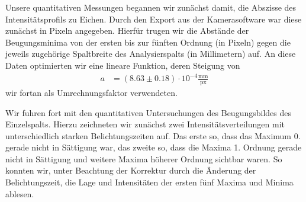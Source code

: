 Unsere quantitativen Messungen begannen wir zunächst damit, die Abszisse des Intensitätsprofils zu Eichen. Durch den Export aus der Kamerasoftware war diese zunächst in Pixeln angegeben. Hierfür trugen wir die Abstände der Beugungsminima von der ersten bis zur fünften Ordnung (in Pixeln) gegen die jeweils zugehörige Spaltbreite des Analysierspalts (in Millimetern) auf. An diese Daten optimierten wir eine lineare Funktion, deren Steigung von
\begin{align*}
  a &= (8.63 \pm 0.18) \cdot 10^{-4} \frac{\si{\milli\meter}}{\mathrm{px}}
\end{align*}
wir fortan als Umrechnungsfaktor verwendeten.

Wir fuhren fort mit den quantitativen Untersuchungen des Beugungsbildes des Einzelspalts. Hierzu zeichneten wir zunächst zwei Intensitätsverteilungen mit unterschiedlich starken Belichtungszeiten auf. Das erste so, dass das Maximum 0. gerade nicht in Sättigung war, das zweite so, dass die Maxima 1. Ordnung gerade nicht in Sättigung und weitere Maxima höherer Ordnung sichtbar waren. So konnten wir, unter Beachtung der Korrektur durch die Änderung der Belichtungszeit, die Lage und Intensitäten der ersten fünf Maxima und Minima ablesen.